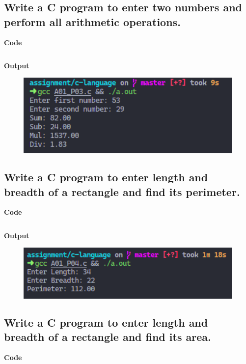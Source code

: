 \documentclass[a4paper]{article}
\begin{document}
\subsection{Write a C program to enter two numbers and perform all arithmetic operations.}
\textbf{Code}

\inputminted{C}{programs/A01_P03.c}

\textbf{Output}

\begin{figure}[h]
  \includegraphics[width=12cm]{A01_P03}
\end{figure}

\newpage



\subsection{Write a C program to enter length and breadth of a rectangle and find its perimeter.}
\textbf{Code}

\inputminted{C}{programs/A01_P04.c}

\textbf{Output}

\begin{figure}[h]
  \includegraphics[width=12cm]{A01_P04}
\end{figure}

\newpage



\subsection{Write a C program to enter length and breadth of a rectangle and find its area.}
\textbf{Code}
\end{document}

